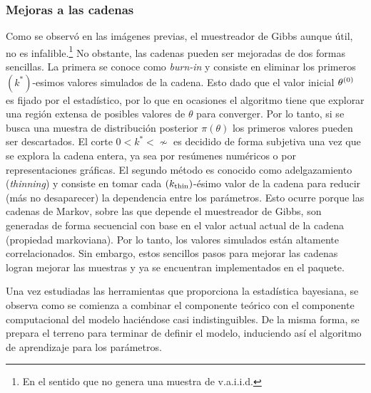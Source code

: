 \documentclass[../Main/Main.tex]{subfiles}
\begin{document}
\subsubsection*{Mejoras a las cadenas}
Como se observó en las imágenes previas, el muestreador de Gibbs aunque útil, no es infalible.\footnote{En el sentido que no genera una muestra de v.a.i.i.d.} No obstante, las cadenas pueden ser mejoradas de dos formas sencillas. La primera se conoce como \textit{burn-in} y consiste en eliminar los primeros $(k^*)$-esimos valores simulados de la cadena. Esto dado que el valor inicial $\theta^{(0)}$ es fijado por el estadístico, por lo que en ocasiones el algoritmo tiene que explorar una región extensa de posibles valores de $\theta$ para converger. Por lo tanto, si se busca una muestra de distribución posterior $\pi(\theta)$ los primeros valores pueden ser descartados. El corte $0<k^*<\nsim$ es decidido de forma subjetiva una vez que se explora la cadena entera, ya sea por resúmenes numéricos o por representaciones gráficas. El segundo método es conocido como adelgazamiento (\textit{thinning}) y consiste en tomar cada $(k_{\text{thin}})$-ésimo valor de la cadena para reducir (más no desaparecer) la dependencia entre los parámetros. Esto ocurre porque las cadenas de Markov, sobre las que depende el muestreador de Gibbs, son generadas de forma secuencial con base en el valor actual actual de la cadena (propiedad markoviana). Por lo tanto, los valores simulados están altamente correlacionados. Sin embargo, estos sencillos pasos para mejorar las cadenas logran mejorar las muestras y ya se encuentran implementados en el paquete.

Una vez estudiadas las herramientas que proporciona la estadística bayesiana, se observa como se comienza a combinar el componente teórico con el componente computacional del modelo haciéndose casi indistinguibles. De la misma forma, se prepara el terreno para terminar de definir el modelo, induciendo así el algoritmo de aprendizaje para los parámetros.
\end{document}
